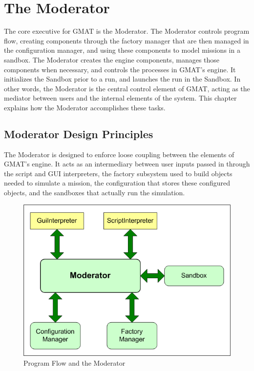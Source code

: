 \chapter{\label{chapter:Moderator}The Moderator}

The core executive for GMAT is the Moderator.  The Moderator controls program flow, creating
components through the factory manager that are then managed in the configuration manager, and using
these components to model missions in a sandbox.  The Moderator creates the engine components,
manages those components when necessary, and controls the processes in GMAT's engine.  It
initializes the Sandbox prior to a run, and launches the run in the Sandbox.  In other words, the
Moderator is the central control element of GMAT, acting as the mediator between users and the
internal elements of the system.  This chapter explains how the Moderator accomplishes these tasks.

\section{Moderator Design Principles}

The Moderator is designed to enforce loose coupling between the elements of GMAT's engine.  It acts
as an intermediary between user inputs passed in through the script and GUI interpreters, the
factory subsystem used to build objects needed to simulate a mission, the configuration that stores
these configured objects, and the sandboxes that actually run the simulation.

\begin{figure}[htb]
\begin{center}
\includegraphics[239,175]{Images/ModeratorInteractions.png}
\caption{Program Flow and the Moderator}
\label{figure:ModeratorInteractions}
\end{center}
\end{figure}

